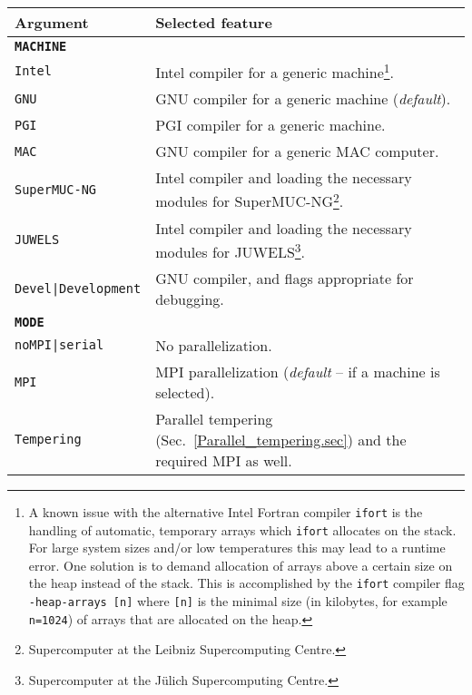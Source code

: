 \begin{table}[h]
	\begin{center}
		\begin{tabular}{@{} l l @{}}\toprule
			Argument & Selected feature \\\midrule
			\textbf{\texttt{MACHINE}} &  \\\midrule
			\texttt{Intel}  &   Intel compiler for a generic machine\footnote{A known issue with the alternative Intel Fortran compiler \texttt{ifort} is the handling of automatic, temporary arrays 
				which \texttt{ifort} allocates on the stack. For large system sizes and/or low temperatures this may lead to a runtime error. One solution is to demand allocation of arrays above a certain size on the heap instead of the stack. This is accomplished by the \texttt{ifort} compiler flag \texttt{-heap-arrays [n]} where \texttt{[n]} is the minimal size (in kilobytes, for example \texttt{n=1024}) of arrays that are allocated on the heap.}. \\
			\texttt{GNU}  &   GNU compiler for a generic machine (\emph{default}). \\
			\texttt{PGI}  &   PGI compiler for a generic machine. \\
			\texttt{MAC}  &   GNU compiler for a generic MAC computer. \\
			\texttt{SuperMUC-NG}  &  Intel compiler and loading the necessary modules for SuperMUC-NG\footnote{Supercomputer at the Leibniz Supercomputing Centre.}. \\
			\texttt{JUWELS}  &  Intel compiler and loading the necessary modules for JUWELS\footnote{Supercomputer at the J\"ulich Supercomputing Centre.}. \\
			\texttt{Devel|Development}  &  GNU compiler, and flags appropriate for debugging.  \vspace{5pt}\\

			\textbf{\texttt{MODE}} &  \\\midrule
			\texttt{noMPI|serial}  &  No parallelization. \\
			\texttt{MPI}  &  MPI parallelization (\emph{default} -- if a machine is selected). \\
			\texttt{Tempering}  &  Parallel tempering (Sec.~\ref{Parallel_tempering.sec}) and the required MPI as well. \vspace{5pt}\\ 


\end{tabular}
\end{center}
\end{table}
